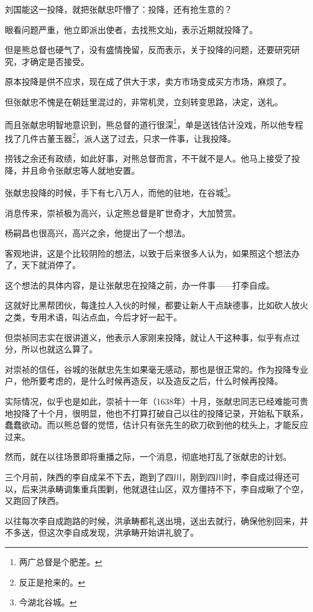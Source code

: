 \begin{multicols}{\theparacolNo}
刘国能这一投降，就把张献忠吓懵了：投降，还有抢生意的？

眼看问题严重，他立即派出使者，去找熊文灿，表示近期就投降了。

但是熊总督也硬气了，没有盛情挽留，反而表示，关于投降的问题，还要研究研究，才确定是否接受。

原本投降是供不应求，现在成了供大于求，卖方市场变成买方市场，麻烦了。

但张献忠不愧是在朝廷里混过的，非常机灵，立刻转变思路，决定，送礼。

而且张献忠明智地意识到，熊总督的道行很深\footnote{两广总督是个肥差。}，单是送钱估计没戏，所以他专程找了几件古董玉器\footnote{反正是抢来的。}，派人送了过去，只求一件事，让我投降。

捞钱之余还有政绩，如此好事，对熊总督而言，不干就不是人。他马上接受了投降，并且命令张献忠等人就地安置。

张献忠投降的时候，手下有七八万人，而他的驻地，在谷城\footnote{今湖北谷城。}。

消息传来，崇祯极为高兴，认定熊总督是旷世奇才，大加赞赏。

杨嗣昌也很高兴，高兴之余，他提出了一个想法。

客观地讲，这是个比较阴险的想法，以致于后来很多人认为，如果照这个想法办了，天下就消停了。

这个想法的具体内容，是让张献忠在投降之前，办一件事——打李自成。

这就好比黑帮团伙，每逢拉人入伙的时候，都要让新人干点缺德事，比如砍人放火之类，专用术语，叫沾点血，今后才好一起干。

但崇祯同志实在很讲道义，他表示人家刚来投降，就让人干这种事，似乎有点过分，所以也就这么算了。

对崇祯的信任，谷城的张献忠先生如果毫无感动，那也是很正常的。作为投降专业户，他所要考虑的，是什么时候再造反，以及造反之后，什么时候再投降。

实际情况，似乎也是如此，崇祯十一年（1638年）十月，张献忠同志已经难能可贵地投降了十个月，很明显，他也不打算打破自己以往的投降记录，开始私下联系，蠢蠢欲动。而以熊总督的觉悟，估计只有张先生的砍刀砍到他的枕头上，才能反应过来。

然而，就在以往场景即将重播之际，一个消息，彻底地打乱了张献忠的计划。

三个月前，陕西的李自成呆不下去，跑到了四川，刚到四川时，李自成过得还可以，后来洪承畴调集重兵围剿，他就退往山区，双方僵持不下，李自成瞅了个空，又跑回了陕西。

以往每次李自成跑路的时候，洪承畴都礼送出境，送出去就行，确保他别回来，并不多送，但这次李自成发现，洪承畴开始讲礼貌了。


\end{multicols}
